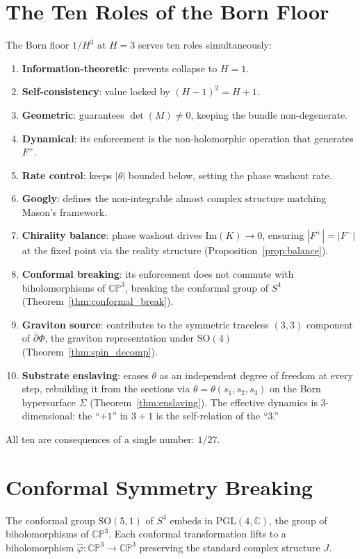 \documentclass[11pt,a4paper]{article}
\theoremstyle{definition}
\theoremstyle{remark}
\newcommand{\CP}{\mathbb{CP}}
\newcommand{\C}{\mathbb{C}}
\newcommand{\dbar}{\bar{\partial}}
\begin{document}
\section{The Ten Roles of the Born Floor}\label{sec:roles}

The Born floor $1/H^3$ at $H=3$ serves ten roles simultaneously:
\begin{enumerate}[nosep]
\item \textbf{Information-theoretic}: prevents collapse to $H=1$.
\item \textbf{Self-consistency}: value locked by $(H-1)^2=H+1$.
\item \textbf{Geometric}: guarantees $\det(M)\neq 0$, keeping the bundle non-degenerate.
\item \textbf{Dynamical}: its enforcement is the non-holomorphic operation that generates $F^+$.
\item \textbf{Rate control}: keeps $|\theta|$ bounded below, setting the phase washout rate.
\item \textbf{Googly}: defines the non-integrable almost complex structure matching Mason's framework.
\item \textbf{Chirality balance}: phase washout drives $\mathrm{Im}(K)\to 0$, ensuring $|F^+|=|F^-|$ at the fixed point via the reality structure (Proposition~\ref{prop:balance}).
\item \textbf{Conformal breaking}: its enforcement does not commute with biholomorphisms of $\CP^3$, breaking the conformal group of $S^4$ (Theorem~\ref{thm:conformal_break}).
\item \textbf{Graviton source}: contributes to the symmetric traceless $(3,3)$ component of $\dbar\Phi$, the graviton representation under $\mathrm{SO}(4)$ (Theorem~\ref{thm:spin_decomp}).
\item \textbf{Substrate enslaving}: erases $\theta$ as an independent degree of freedom at every step, rebuilding it from the sections via $\theta=\theta(s_1,s_2,s_3)$ on the Born hypersurface $\Sigma$ (Theorem~\ref{thm:enslaving}). The effective dynamics is $3$-dimensional: the ``$+1$'' in $3+1$ is the self-relation of the ``$3$.''
\end{enumerate}
All ten are consequences of a single number: $1/27$.


\section{Conformal Symmetry Breaking}\label{sec:conformal}

The conformal group $\mathrm{SO}(5,1)$ of $S^4$ embeds in $\mathrm{PGL}(4,\C)$, the group of biholomorphisms of $\CP^3$. Each conformal transformation lifts to a biholomorphism $\hat\varphi:\CP^3\to\CP^3$ preserving the standard complex structure $J$.
\end{document}
